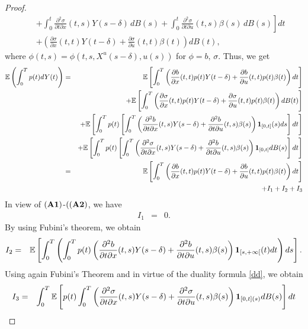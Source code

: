\documentclass[12pt]{article}
\theoremstyle{remark}
\numberwithin{equation}{section}
\def\E{\mathbb E}
\def\E{\mathbb E}
\begin{document}
\begin{proof}
\begin{eqnarray*}
 &&\left.+\int_{0}^{t}\frac{\partial^{2}\sigma}{\partial t \partial x}(t,s)Y(s-\delta)\, dB(s)+\int_{0}^{t}\frac{\partial^{2}\sigma}{\partial t \partial u}(t,s)\beta(s)\, dB(s)\right] dt\nonumber\\
 &&+ \left(\frac{\partial \sigma}{\partial x}(t,t)Y(t-\delta)
+ \frac{\partial \sigma}{\partial u}(t,t)\beta(t)\right)dB(t),	
\end{eqnarray*}
where $\phi(t,s)=\phi(t,s,X^{u}(s-\delta),u(s))$ for $\phi=b,\, \sigma$.
Thus, we get
\begin{eqnarray}\label{Eq002}
\E\left(\int_0^T p(t)dY(t)\right)&=&\E\left[\int_0^T\left(\frac{\partial b}{\partial x}(t, t)p(t) Y(t-\delta)+\frac{\partial b}{\partial u}(t, t)p(t) \beta(t)\right)dt\right]\nonumber\\ 
&&+\E\left[\int_0^T \left(\frac{\partial \sigma}{\partial x}(t, t)p(t) Y(t-\delta)+\frac{\partial \sigma}{\partial u}(t, t) p(t)\beta(t)\right)dB(t)\right]\nonumber\\
&&+\E\left[\int_0^Tp(t)\left[\int_0^T\left(\frac{\partial^2 b}{\partial t \partial x}(t, s)Y(s-\delta)+\frac{\partial^2 b}{\partial t \partial u}(t, s) \beta(s)\right){\bf 1 }_{[0,t]}(s) ds\right]dt\right]\nonumber\\
&&+ \E\left[\int_0^T p(t)\left[\int_0^T \left(\frac{\partial^2 \sigma}{\partial t \partial x}(t, s)Y(s-\delta)+\frac{\partial^2 b}{\partial t \partial u}(t, s) \beta(s)\right){\bf 1 }_{[0,t]}dB(s)\right]dt\right]\nonumber\\
&=& \E\left[\int_0^T\left(\frac{\partial b}{\partial x}(t, t)p(t) Y(t-\delta)+\frac{\partial b}{\partial u}(t, t)p(t) \beta(t)\right)dt\right]\nonumber\\ 
&&+I_1+I_2+I_3	
\end{eqnarray}
In view of $({\bf A1})$-$(({\bf A2})$, we have 
\begin{eqnarray}\label{Eq005}
I_1 &=& 0.
\end{eqnarray}
By using Fubini's theorem, we obtain
\begin{eqnarray}\label{Eq003}
 I_2 &=&\mathbb{E}\left[ \int_0^T \left( \int_0^T p(t) \left(\frac{\partial^{2}
	b}{\partial t \partial x}(t, s)Y(s-\delta)+\frac{\partial^{2}
		b}{\partial t \partial u}(t, s)\beta(s)\right){\bf 1 }_{[s,+\infty[}(t)dt\right)ds\right]. 	
\end{eqnarray}
Using again Fubini's Theorem and in virtue of the duality formula  \eqref{dd}, we obtain
\begin{eqnarray*}
I_3 &=&\int_0^T \mathbb{E}\left[ p(t)\int_0^T  \left(\frac{\partial^{2} \sigma}{\partial t \partial x}(t, s)Y(s-\delta)+\frac{\partial^{2} \sigma}{\partial t \partial u}(t, s)\beta(s)\right){\bf 1 }_{[0,t](s)}dB(s)\right] dt\\

\end{eqnarray*}
\end{proof}
\end{document}
